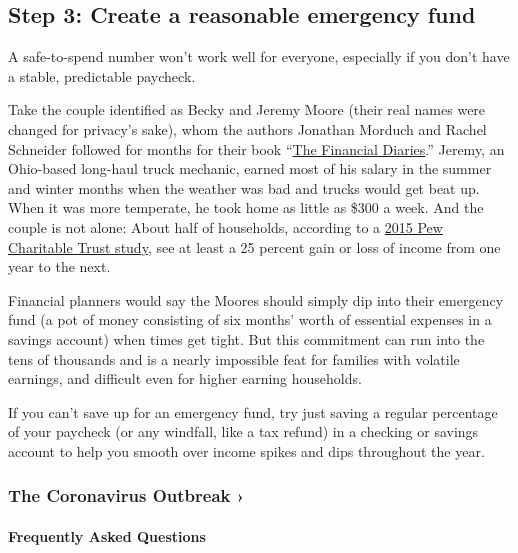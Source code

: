 \hypertarget{step-3-create-a-reasonable-emergency-fund}{%
\subsection{Step 3: Create a reasonable emergency
fund}\label{step-3-create-a-reasonable-emergency-fund}}

A safe-to-spend number won't work well for everyone, especially if you
don't have a stable, predictable paycheck.

Take the couple identified as Becky and Jeremy Moore (their real names
were changed for privacy's sake), whom the authors Jonathan Morduch and
Rachel Schneider followed for months for their book
``\href{https://www.usfinancialdiaries.org/book}{The Financial
Diaries}.'' Jeremy, an Ohio-based long-haul truck mechanic, earned most
of his salary in the summer and winter months when the weather was bad
and trucks would get beat up. When it was more temperate, he took home
as little as \$300 a week. And the couple is not alone: About half of
households, according to a
\href{https://www.pewtrusts.org/~/media/Assets/2015/01/FSM_Balance_Sheet_Report.pdf}{2015
Pew Charitable Trust study}, see at least a 25 percent gain or loss of
income from one year to the next.

Financial planners would say the Moores should simply dip into their
emergency fund (a pot of money consisting of six months' worth of
essential expenses in a savings account) when times get tight. But this
commitment can run into the tens of thousands and is a nearly impossible
feat for families with volatile earnings, and difficult even for higher
earning households.

If you can't save up for an emergency fund, try just saving a regular
percentage of your paycheck (or any windfall, like a tax refund) in a
checking or savings account to help you smooth over income spikes and
dips throughout the year.

\href{https://www.nytimes3xbfgragh.onion/news-event/coronavirus?action=click\&pgtype=Article\&state=default\&region=MAIN_CONTENT_3\&context=storylines_faq}{}

\hypertarget{the-coronavirus-outbreak-}{%
\subsubsection{The Coronavirus Outbreak
›}\label{the-coronavirus-outbreak-}}

\hypertarget{frequently-asked-questions}{%
\paragraph{Frequently Asked
Questions}\label{frequently-asked-questions}}

